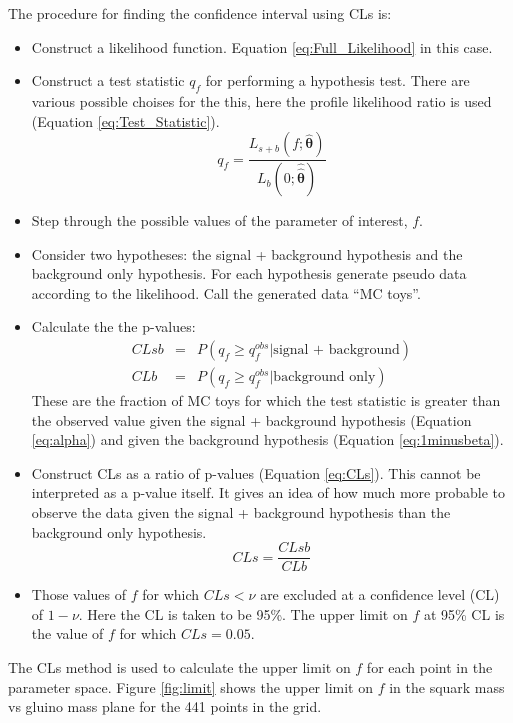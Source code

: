 The procedure for finding the confidence interval using CLs is:

\begin{itemize}
\item Construct a likelihood function. Equation \ref{eq:Full_Likelihood} in this 
case.
\item Construct a test statistic $q_{f}$ for performing a hypothesis test. There 
are various possible choises for the this, here the profile likelihood ratio is
used (Equation \ref{eq:Test_Statistic}).
\begin{equation}
q_{f} =
\frac{L_{s+b}(f;\hat{\boldsymbol\theta})}{L_{b}(0;\hat{\hat{\boldsymbol\theta}})}
\label{eq:Test_Statistic}
\end{equation}
\item Step through the possible values of the parameter of interest, $f$.
\item Consider two hypotheses: the signal + background hypothesis and the
background only hypothesis. For each hypothesis generate pseudo data according 
to the likelihood. Call the generated data ``MC toys''.
\item Calculate the the p-values:
\begin{eqnarray}
CLsb &=& P(q_f \geq q_f^{obs}|\mbox{signal + background}) \label{eq:alpha} \\
CLb &=& P(q_f \geq q_f^{obs}|\mbox{background only}) \label{eq:1minusbeta}
\end{eqnarray}
These are the fraction of MC toys for which the test statistic is greater than
the observed value given the signal + background hypothesis (Equation
\ref{eq:alpha}) and given the background hypothesis (Equation 
\ref{eq:1minusbeta}).
\item Construct CLs as a ratio of p-values (Equation \ref{eq:CLs}). This cannot 
be interpreted as a p-value itself. It gives an idea of how much more probable 
to observe the data given the signal + background hypothesis than the background 
only hypothesis.
\begin{equation}
CLs = \frac{CLsb}{CLb}
\label{eq:CLs}
\end{equation}
\item Those values of $f$ for which $CLs < \nu$ are excluded at a confidence
level (CL) of $1-\nu$. Here the CL is taken to be 95\%. The upper limit on $f$ 
at 95\% CL is the value of $f$ for which $CLs = 0.05$.
\end{itemize}

The CLs method is used to calculate the upper limit on $f$ for each point in the
parameter space. Figure \ref{fig:limit} shows the upper limit on $f$ in the
squark mass vs gluino mass plane for the 441 points in the grid.

